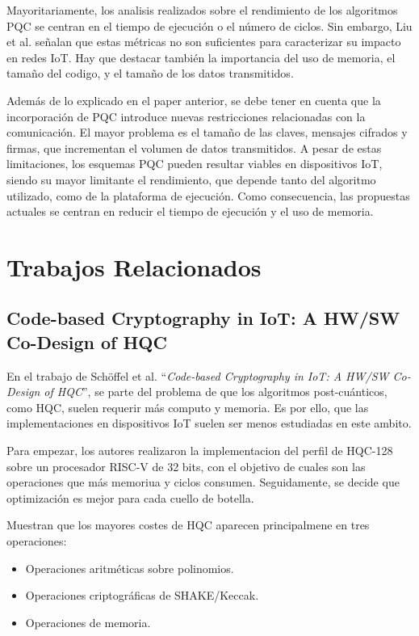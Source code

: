     Mayoritariamente, los analisis realizados sobre el rendimiento de los algoritmos PQC se centran en el tiempo de ejecución o el número de ciclos. Sin embargo, Liu et al. señalan que estas métricas
    no son suficientes para caracterizar su impacto en redes IoT. Hay que destacar también la importancia del uso de memoria, el tamaño del codigo, y el tamaño de los datos transmitidos. 

    Además de lo explicado en el paper anterior, se debe tener en cuenta que la incorporación de PQC introduce nuevas restricciones relacionadas con la comunicación. El mayor problema es el tamaño 
    de las claves, mensajes cifrados y firmas, que incrementan el volumen de datos transmitidos. A pesar de estas limitaciones, los esquemas PQC pueden resultar viables en dispositivos IoT, siendo su 
    mayor limitante el rendimiento, que depende tanto del algoritmo utilizado, como de la plataforma de ejecución. Como consecuencia, las propuestas actuales se centran en reducir el tiempo de ejecución y 
    el uso de memoria.

    \section{Trabajos Relacionados}

    \subsection{Code-based Cryptography in IoT: A HW/SW Co-Design of HQC}

    En el trabajo de Schöffel et al. ``\textit{Code-based Cryptography in IoT: A HW/SW Co-Design of HQC}'', se parte del problema de que los algoritmos post-cuánticos, como HQC, suelen requerir
    más computo y memoria. Es por ello, que las implementaciones en dispositivos IoT suelen ser menos estudiadas en este ambito.

    Para empezar, los autores realizaron la implementacion del perfil de HQC-128 sobre un procesador RISC-V de 32 bits, con el objetivo de
    cuales son las operaciones que más memoriua y ciclos consumen. Seguidamente, se decide que optimización es mejor para cada cuello de botella. 
    
    Muestran que los mayores costes de HQC aparecen principalmene en tres operaciones: 
    \begin{itemize}
        \item Operaciones aritméticas sobre polinomios.
        \item Operaciones criptográficas de SHAKE/Keccak.
        \item Operaciones de memoria. 
    \end{itemize}

